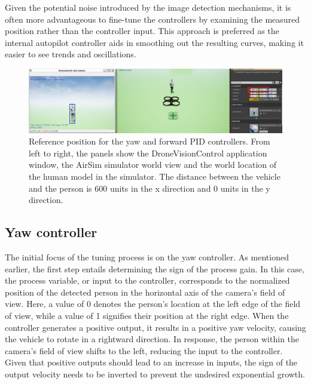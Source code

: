 Given the potential noise introduced by the image detection mechanisms, it is often more advantageous to fine-tune the controllers by examining the measured position rather than the controller input. This approach is preferred as the internal autopilot controller aids in smoothing out the resulting curves, making it easier to see trends and oscillations.



\begin{figure}[H]
  \centering
  \includegraphics[width=\textwidth, keepaspectratio]{img/pid/tune-ref-pos.jpg}
  \caption{Reference position for the yaw and forward PID controllers. From left to right, the panels show the DroneVisionControl application window, the AirSim simulator world view and the world location of the human model in the simulator. The distance between the vehicle and the person is 600 units in the x direction and 0 units in the y direction.}
  \label{fig:tune-start-pos}
\end{figure}


\subsection{Yaw controller}

The initial focus of the tuning process is on the yaw controller. As mentioned earlier, the first step entails determining the sign of the process gain. In this case, the process variable, or input to the controller, corresponds to the normalized position of the detected person in the horizontal axis of the camera's field of view. Here, a value of 0 denotes the person's location at the left edge of the field of view, while a value of 1 signifies their position at the right edge. When the controller generates a positive output, it results in a positive yaw velocity, causing the vehicle to rotate in a rightward direction. In response, the person within the camera's field of view shifts to the left, reducing the input to the controller. Given that positive outputs should lead to an increase in inputs, the sign of the output velocity needs to be inverted to prevent the undesired exponential growth.

